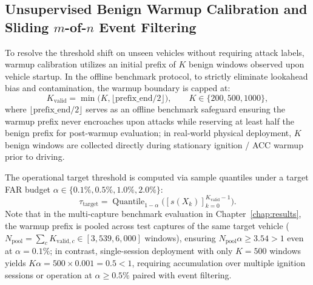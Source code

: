 \documentclass[12pt, a4paper, reqno, oneside]{book}
\begin{document}
\subsection[Unsupervised Benign Warmup Calibration and Sliding m-of-n Event Filtering]{Unsupervised Benign Warmup Calibration and Sliding \texorpdfstring{$m$-of-$n$}{m-of-n} Event Filtering}\label{subsec:method-calibration}
To resolve the threshold shift on unseen vehicles without requiring attack labels, warmup calibration utilizes an initial prefix of $K$ benign windows observed upon vehicle startup. In the offline benchmark protocol, to strictly eliminate lookahead bias and contamination, the warmup boundary is capped at:
\begin{equation}
K_{\text{valid}} = \min\big(K, \lfloor \mathrm{prefix\_end} / 2 \rfloor\big), \qquad K \in \{200, 500, 1000\},
\end{equation}
where $\lfloor \mathrm{prefix\_end} / 2 \rfloor$ serves as an offline benchmark safeguard ensuring the warmup prefix never encroaches upon attacks while reserving at least half the benign prefix for post-warmup evaluation; in real-world physical deployment, $K$ benign windows are collected directly during stationary ignition / ACC warmup prior to driving.

The operational target threshold is computed via sample quantiles under a target FAR budget $\alpha \in \{0.1\%, 0.5\%, 1.0\%, 2.0\%\}$:
\begin{equation}
\tau_{\text{target}} = \operatorname{Quantile}_{1-\alpha}\big([s(X_k)]_{k=0}^{K_{\text{valid}}-1}\big).
\end{equation}
Note that in the multi-capture benchmark evaluation in Chapter~\ref{chap:results}, the warmup prefix is pooled across test captures of the same target vehicle ($N_{\text{pool}} = \sum_c K_{\text{valid}, c} \in [3{,}539, 6{,}000]$ windows), ensuring $N_{\text{pool}}\alpha \ge 3.54 > 1$ even at $\alpha = 0.1\%$; in contrast, single-session deployment with only $K=500$ windows yields $K\alpha = 500 \times 0.001 = 0.5 < 1$, requiring accumulation over multiple ignition sessions or operation at $\alpha \ge 0.5\%$ paired with event filtering.
\end{document}
